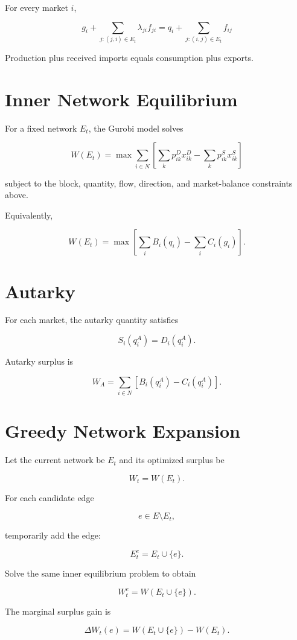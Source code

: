 \documentclass[11pt]{article}
\begin{document}
For every market $i$,

\[
\boxed{
g_i+
\sum_{j:(j,i)\in E_t}
\lambda_{ji}f_{ji}
=
q_i+
\sum_{j:(i,j)\in E_t}
f_{ij}
}
\]

Production plus received imports equals consumption plus exports.

\section{Inner Network Equilibrium}

For a fixed network $E_t$, the Gurobi model solves

\[
\boxed{
W(E_t)=
\max
\sum_{i\in N}
\left[
\sum_k p^D_{ik}x^D_{ik}
-
\sum_k p^S_{ik}x^S_{ik}
\right]
}
\]

subject to the block, quantity, flow, direction, and market-balance constraints above.

Equivalently,

\[
W(E_t)
=
\max
\left[
\sum_i B_i(q_i)
-
\sum_i C_i(g_i)
\right].
\]

\section{Autarky}

For each market, the autarky quantity satisfies

\[
S_i(q_i^A)=D_i(q_i^A).
\]

Autarky surplus is

\[
\boxed{
W_A=
\sum_{i\in N}
\left[
B_i(q_i^A)-C_i(q_i^A)
\right].
}
\]

\section{Greedy Network Expansion}

Let the current network be $E_t$ and its optimized surplus be

\[
W_t=W(E_t).
\]

For each candidate edge

\[
e\in E\setminus E_t,
\]

temporarily add the edge:

\[
E_t^e=E_t\cup\{e\}.
\]

Solve the same inner equilibrium problem to obtain

\[
W_t^e=W(E_t\cup\{e\}).
\]

The marginal surplus gain is

\[
\boxed{
\Delta W_t(e)
=
W(E_t\cup\{e\})-W(E_t).
}
\]
\end{document}
